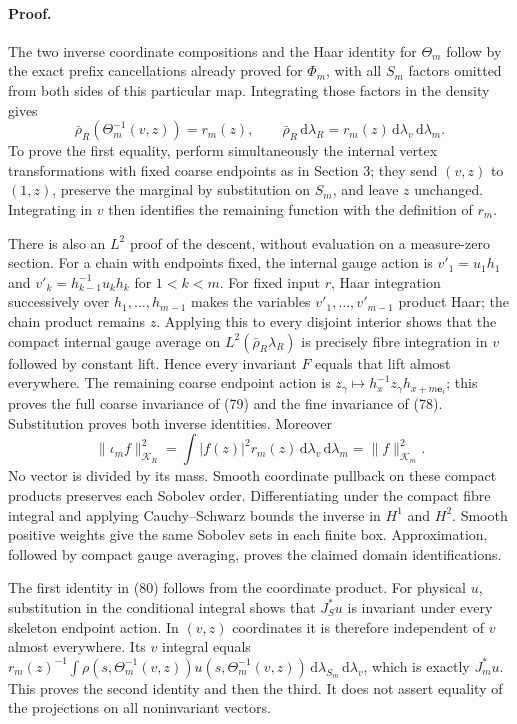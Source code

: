 \documentclass[11pt]{article}
\newcommand{\dd}{\,\mathrm d}
\newcommand{\KK}{\mathscr K}
\begin{document}
\paragraph{Proof.}
The two inverse coordinate compositions and the Haar identity for
$\Theta_m$ follow by the exact prefix cancellations already proved
for $\Phi_m$, with all $S_m$ factors omitted from both sides of
this particular map. Integrating those factors in the density gives
\[
 \bar\rho_R(\Theta_m^{-1}(v,z))=r_m(z),\qquad
 \bar\rho_R\dd\lambda_R=r_m(z)\dd\lambda_v\dd\lambda_m.
\]
To prove the first equality, perform simultaneously the internal
vertex transformations with fixed coarse endpoints as in Section 3;
they send $(v,z)$ to $(1,z)$, preserve the marginal by substitution
on $S_m$, and leave $z$ unchanged. Integrating in $v$ then identifies
the remaining function with the definition of $r_m$.

There is also an $L^2$ proof of the descent, without evaluation on
a measure-zero section. For a chain with endpoints fixed, the
internal gauge action is
$v'_1=u_1h_1$ and $v'_k=h_{k-1}^{-1}u_kh_k$ for $1<k<m$.
For fixed input $r$, Haar integration successively over
$h_1,\ldots,h_{m-1}$ makes the variables $v'_1,\ldots,v'_{m-1}$
product Haar; the chain product remains $z$. Applying this to every
disjoint interior shows that the compact internal gauge average on
$L^2(\bar\rho_R\lambda_R)$ is precisely fibre integration in $v$
followed by constant lift. Hence every invariant $F$ equals that
lift almost everywhere. The remaining coarse endpoint action is
$z_\gamma\mapsto h_x^{-1}z_\gamma h_{x+m\mathbf e_i}$; this proves
the full coarse invariance of (79) and the
fine invariance of (78). Substitution proves
both inverse identities. Moreover
\[
 \|\iota_m f\|_{\mathcal K_R}^2
 =\int |f(z)|^2r_m(z)\dd\lambda_v\dd\lambda_m
 =\|f\|_{\KK_m}^2.
\]
No vector is divided by its mass. Smooth coordinate pullback on
these compact products preserves each Sobolev order. Differentiating
under the compact fibre integral and applying Cauchy--Schwarz bounds
the inverse in $H^1$ and $H^2$. Smooth positive weights give the
same Sobolev sets in each finite box. Approximation, followed by
compact gauge averaging, proves the claimed domain identifications.

The first identity in (80) follows from
the coordinate product. For physical $u$, substitution in the
conditional integral shows that $J_S^*u$ is invariant under every
skeleton endpoint action. In $(v,z)$ coordinates it is therefore
independent of $v$ almost everywhere. Its $v$ integral equals
$r_m(z)^{-1}\int\rho(s,\Theta_m^{-1}(v,z))
u(s,\Theta_m^{-1}(v,z))\dd\lambda_{S_m}\dd\lambda_v$,
which is exactly $J_m^*u$. This proves the second identity and then
the third. It does not assert equality of the projections on all
noninvariant vectors.
\end{document}

